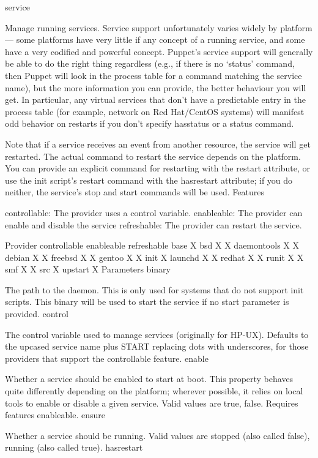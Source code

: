 service

Manage running services. Service support unfortunately varies widely by platform — some platforms have very little if any concept of a running service, and some have a very codified and powerful concept. Puppet’s service support will generally be able to do the right thing regardless (e.g., if there is no ‘status’ command, then Puppet will look in the process table for a command matching the service name), but the more information you can provide, the better behaviour you will get. In particular, any virtual services that don’t have a predictable entry in the process table (for example, network on Red Hat/CentOS systems) will manifest odd behavior on restarts if you don’t specify hasstatus or a status command.

Note that if a service receives an event from another resource, the service will get restarted. The actual command to restart the service depends on the platform. You can provide an explicit command for restarting with the restart attribute, or use the init script’s restart command with the hasrestart attribute; if you do neither, the service’s stop and start commands will be used.
Features

    controllable: The provider uses a control variable.
    enableable: The provider can enable and disable the service
    refreshable: The provider can restart the service.

Provider 	controllable 	enableable 	refreshable
base 	  	  	X
bsd 	  	X 	X
daemontools 	  	X 	X
debian 	  	X 	X
freebsd 	  	X 	X
gentoo 	  	X 	X
init 	  	  	X
launchd 	  	X 	X
redhat 	  	X 	X
runit 	  	X 	X
smf 	  	X 	X
src 	  	  	X
upstart 	  	  	X
Parameters
binary

The path to the daemon. This is only used for systems that do not support init scripts. This binary will be used to start the service if no start parameter is provided.
control

The control variable used to manage services (originally for HP-UX). Defaults to the upcased service name plus START replacing dots with underscores, for those providers that support the controllable feature.
enable

Whether a service should be enabled to start at boot. This property behaves quite differently depending on the platform; wherever possible, it relies on local tools to enable or disable a given service. Valid values are true, false. Requires features enableable.
ensure

Whether a service should be running. Valid values are stopped (also called false), running (also called true).
hasrestart


